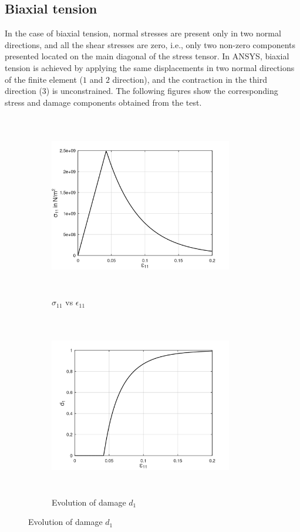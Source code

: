 \documentclass[12pt,a4paper,twoside,openright]{report}
\begin{document}
\subsection{Biaxial tension}
\indent\indent\indent  In the case of biaxial tension, normal stresses are present only in two normal directions, and all the shear stresses are zero, i.e., only two non-zero components presented located on the main diagonal of the stress tensor. In ANSYS, biaxial tension is achieved by applying the same displacements in two normal directions of the finite element ($1$ and $2$ direction), and the contraction in the third direction ($3$) is unconstrained. The following figures show the corresponding stress and damage components obtained from the test.
\begin{figure}[hbt!]
     \captionsetup[subfigure]{justification=centering}
     \begin{subfigure}{0.4\textwidth}
         \includegraphics[width=8cm,height=8cm,keepaspectratio]{23.S11vsE11.png}
         \caption{$\sigma_{11}$ vs $\epsilon_{11}$}
         \label{fig:S11vsE11}
     \end{subfigure}
	\hspace{1.5cm}
     \captionsetup[subfigure]{justification=centering}
     \begin{subfigure}{0.4\textwidth}
         \includegraphics[width=8cm,height=8cm,keepaspectratio]{23.d1.png}
         \caption{Evolution of damage $d_{1}$}
         \label{fig:Evolution of damage d1}
     \end{subfigure}
\end{figure}
\end{document}

